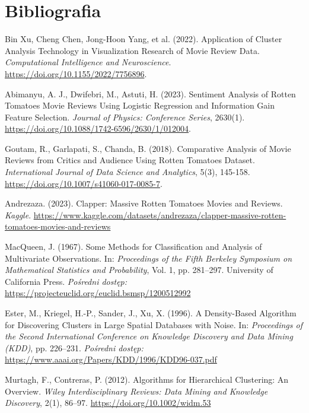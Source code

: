 \documentclass[a4paper,12pt,titlepage]{article}
\begin{document}
\section{Bibliografia}
\begin{thebibliography}{9}

Bin Xu, Cheng Chen, Jong-Hoon Yang, et al. (2022). Application of Cluster Analysis Technology in Visualization Research of Movie Review Data. \textit{Computational Intelligence and Neuroscience}. \url{https://doi.org/10.1155/2022/7756896}.

Abimanyu, A. J., Dwifebri, M., Astuti, H. (2023). Sentiment Analysis of Rotten Tomatoes Movie Reviews Using Logistic Regression and Information Gain Feature Selection. \textit{Journal of Physics: Conference Series}, 2630(1). \url{https://doi.org/10.1088/1742-6596/2630/1/012004}.

Goutam, R., Garlapati, S., Chanda, B. (2018). Comparative Analysis of Movie Reviews from Critics and Audience Using Rotten Tomatoes Dataset. \textit{International Journal of Data Science and Analytics}, 5(3), 145-158. \url{https://doi.org/10.1007/s41060-017-0085-7}.

 Andrezaza. (2023). Clapper: Massive Rotten Tomatoes Movies and Reviews. \textit{Kaggle}. \url{https://www.kaggle.com/datasets/andrezaza/clapper-massive-rotten-tomatoes-movies-and-reviews}

 MacQueen, J. (1967). Some Methods for Classification and Analysis of Multivariate Observations. In: \textit{Proceedings of the Fifth Berkeley Symposium on Mathematical Statistics and Probability}, Vol. 1, pp. 281–297. University of California Press. \textit{Pośredni dostęp:} \url{https://projecteuclid.org/euclid.bsmsp/1200512992}

 Ester, M., Kriegel, H.-P., Sander, J., Xu, X. (1996). A Density-Based Algorithm for Discovering Clusters in Large Spatial Databases with Noise. In: \textit{Proceedings of the Second International Conference on Knowledge Discovery and Data Mining (KDD)}, pp. 226–231. \textit{Pośredni dostęp:} \url{https://www.aaai.org/Papers/KDD/1996/KDD96-037.pdf}

 Murtagh, F., Contreras, P. (2012). Algorithms for Hierarchical Clustering: An Overview. \textit{Wiley Interdisciplinary Reviews: Data Mining and Knowledge Discovery}, 2(1), 86--97. \url{https://doi.org/10.1002/widm.53}

\end{thebibliography}
\end{document}
